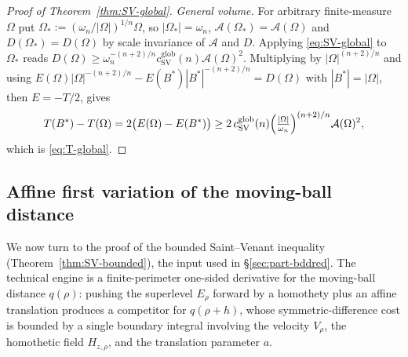 \documentclass[11pt]{amsart}
\theoremstyle{definition}
\newcommand{\Om}{\Omega}
\newcommand{\Fr}{\mathcal A}
\newcommand{\abs}[1]{\left|#1\right|}
\begin{document}
\begin{proof}[Proof of Theorem~\ref{thm:SV-global}]
\emph{General volume.} For arbitrary finite-measure $\Om$ put
$\Om_*:=(\omega_n/\abs{\Om})^{1/n}\Om$, so $\abs{\Om_*}=\omega_n$,
$\Fr(\Om_*)=\Fr(\Om)$ and $D(\Om_*)=D(\Om)$ by scale invariance of
$\Fr$ and $D$. Applying \eqref{eq:SV-global} to $\Om_*$ reads
$D(\Om)\ge\omega_n^{-(n+2)/n}c_{\mathrm{SV}}^{\mathrm{glob}}(n)\Fr(\Om)^2$.
Multiplying by $\abs{\Om}^{(n+2)/n}$ and using
$E(\Om)\abs{\Om}^{-(n+2)/n}-E(B^*)\abs{B^*}^{-(n+2)/n}=D(\Om)$ with
$\abs{B^*}=\abs{\Om}$, then $E=-T/2$, gives
\[
   T(B^*)-T(\Om)=2\bigl(E(\Om)-E(B^*)\bigr)
   \ge2\,c_{\mathrm{SV}}^{\mathrm{glob}}(n)
   \Bigl(\tfrac{\abs{\Om}}{\omega_n}\Bigr)^{(n+2)/n}\Fr(\Om)^2,
\]
which is \eqref{eq:T-global}.
\end{proof}

\subsection{Affine first variation of the moving-ball distance}\label{sec:part-shell}\label{sec:shell}

We now turn to the proof of the bounded Saint--Venant inequality
(Theorem~\ref{thm:SV-bounded}), the input used in
\S\ref{sec:part-bddred}.  The technical engine is a finite-perimeter
one-sided derivative for the moving-ball distance \(q(\rho)\): pushing
the superlevel \(E_\rho\) forward by a homothety plus an affine
translation produces a competitor for \(q(\rho+h)\), whose
symmetric-difference cost is bounded by a single boundary integral
involving the velocity \(V_\rho\), the homothetic field \(H_{z,\rho}\),
and the translation parameter \(a\).
\end{document}
